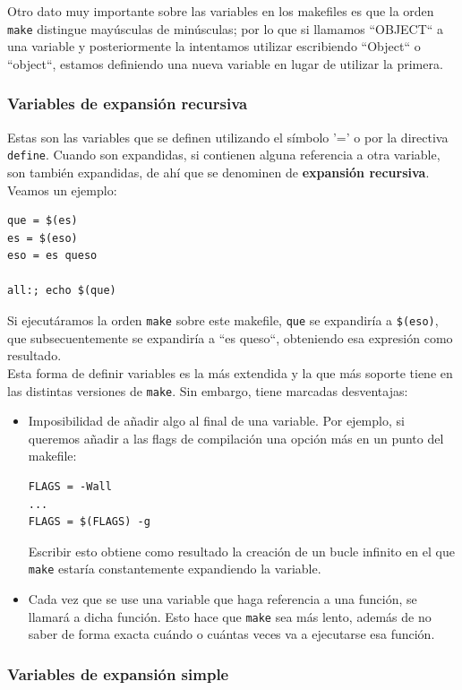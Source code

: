 \documentclass[11pt,twoside,titlepage,a4paper]{article}
\theoremstyle{definition}
\theoremstyle{plain_rojo}
\theoremstyle{remark}
\begin{document}
Otro dato muy importante sobre las variables en los makefiles es que la orden
\texttt{make} distingue mayúsculas de minúsculas; por lo que si llamamos
``OBJECT`` a una variable y posteriormente la intentamos utilizar escribiendo
``Object`` o ``object``, estamos definiendo una nueva variable en lugar de
utilizar la primera.

\subsubsection{Variables de expansión recursiva}

Estas son las variables que se definen utilizando el símbolo '=' o por la 
directiva \texttt{define}. Cuando son expandidas, si contienen alguna 
referencia a otra variable, son también expandidas, de ahí que se denominen
de \textbf{expansión recursiva}. Veamos un ejemplo:
\bigskip
\begin{lstlisting}
que = $(es)
es = $(eso)
eso = es queso

all:; echo $(que)
\end{lstlisting}
\bigskip
Si ejecutáramos la orden \texttt{make} sobre este makefile, \texttt{que} se expandiría a \texttt{\$(eso)}, que subsecuentemente se expandiría a ``es 
queso``, obteniendo esa expresión como resultado.
\\

Esta forma de definir variables es la más extendida y la que más soporte tiene
en las distintas versiones de \texttt{make}. Sin embargo, tiene marcadas 
desventajas:

\begin{itemize}[font={\color{rojooscuro}\bfseries}]
	\item Imposibilidad de añadir algo al final de una variable. Por ejemplo,
	si queremos añadir a las flags de compilación una opción más en un punto
	del makefile:
	\begin{lstlisting}
FLAGS = -Wall
...
FLAGS = $(FLAGS) -g
	\end{lstlisting}
	Escribir esto obtiene como resultado la creación de un bucle infinito en
	el que \texttt{make} estaría constantemente expandiendo la variable.
	\item Cada vez que se use una variable que haga referencia a una función, 
	se llamará a dicha función. Esto hace que \texttt{make} sea más lento, 
	además de no saber de forma exacta cuándo o cuántas veces va a ejecutarse 
	esa función.
\end{itemize}

\subsubsection{Variables de expansión simple}
\end{document}

